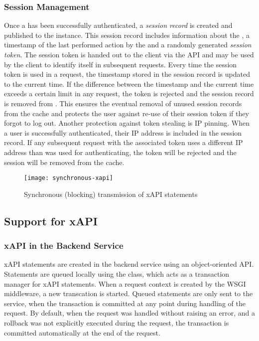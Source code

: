     \subsubsection{Session Management}
        Once a  has been successfully authenticated, a \textit{session record}
        is created and published to the  instance.
        This session record includes information about the
        , a timestamp of the last performed action by the 
        and a randomly generated \textit{session token}.
        The session token is handed out to the client via the API
        and may be used by the client to identify itself
        in subsequent requests. Every time the session token is used
        in a request, the timestamp stored in the session record is
        updated to the current time. If the difference between
        the timestamp and the current time exceeds a certain limit
        in any request, the token is rejected and the session record
        is removed from . This ensures the eventual
        removal of unused session records from the cache and protects
        the user against re-use of their session token if they forgot
        to log out. Another protection against token stealing
        is IP pinning. When a user is successfully authenticated,
        their IP address is included in the session record.
        If any subsequent request with the associated token
        uses a different IP address than was used for authenticating,
        the token will be rejected and the session will be removed
        from the cache.

        \begin{wrapfigure}[20]{o}{.5\textwidth}
            \centering
            \texttt{[image: synchronous-xapi]}
            \caption{Synchronous (blocking) transmission of xAPI statements}
            \label{fig:synchronous-xapi}
        \end{wrapfigure}

\pagebreak

\subsection{Support for xAPI}
\label{implementation:xapi}
     
    \subsubsection{xAPI in the Backend Service}
        xAPI statements are created in the backend service using an
        object-oriented API. Statements are queued locally using
        the  class, which acts as a transaction manager
        for xAPI statements. When a request context is created by the
        WSGI middleware, a new transcation is started. 
        Queued statements are only sent to the  service, 
        when the transaction is committed at any point during handling 
        of the request. By default, when the request was handled
        without raising an error, and a rollback was not explicitly
        executed during the request, the transaction is committed automatically
        at the end of the request.

